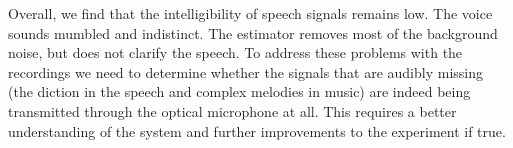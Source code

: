 \documentclass[paper-main.tex]{subfiles}
\begin{document}
Overall, we find that the intelligibility of speech signals remains low. 
The voice sounds mumbled and indistinct. 
The estimator removes most of the background noise, but does not clarify the speech. 
To address these problems with the recordings we need to determine whether the signals that are audibly missing (the diction in the speech and complex melodies in music) are indeed being transmitted through the optical microphone at all. 
This requires a better understanding of the system and further improvements to the experiment if true.
\end{document}
